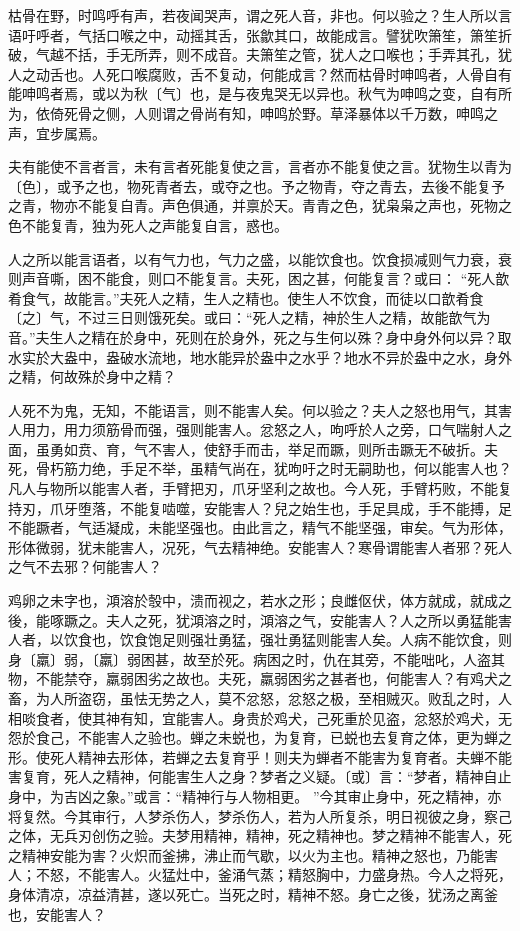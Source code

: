 \documentclass[]{article}
\begin{document}
枯骨在野，时鸣呼有声，若夜闻哭声，谓之死人音，非也。何以验之？生人所以言语吁呼者，气括口喉之中，动摇其舌，张歙其口，故能成言。譬犹吹箫笙，箫笙折破，气越不括，手无所弄，则不成音。夫箫笙之管，犹人之口喉也；手弄其孔，犹人之动舌也。人死口喉腐败，舌不复动，何能成言？然而枯骨时呻鸣者，人骨自有能呻鸣者焉，或以为秋〔气〕也，是与夜鬼哭无以异也。秋气为呻鸣之变，自有所为，依倚死骨之侧，人则谓之骨尚有知，呻鸣於野。草泽暴体以千万数，呻鸣之声，宜步属焉。

夫有能使不言者言，未有言者死能复使之言，言者亦不能复使之言。犹物生以青为〔色〕，或予之也，物死青者去，或夺之也。予之物青，夺之青去，去後不能复予之青，物亦不能复自青。声色俱通，并禀於天。青青之色，犹枭枭之声也，死物之色不能复青，独为死人之声能复自言，惑也。

人之所以能言语者，以有气力也，气力之盛，以能饮食也。饮食损减则气力衰，衰则声音嘶，困不能食，则口不能复言。夫死，困之甚，何能复言？或曰：
``死人歆肴食气，故能言。''夫死人之精，生人之精也。使生人不饮食，而徒以口歆肴食〔之〕气，不过三日则饿死矣。或曰：``死人之精，神於生人之精，故能歆气为音。''夫生人之精在於身中，死则在於身外，死之与生何以殊？身中身外何以异？取水实於大盎中，盎破水流地，地水能异於盎中之水乎？地水不异於盎中之水，身外之精，何故殊於身中之精？

人死不为鬼，无知，不能语言，则不能害人矣。何以验之？夫人之怒也用气，其害人用力，用力须筋骨而强，强则能害人。忿怒之人，呴呼於人之旁，口气喘射人之面，虽勇如贲、育，气不害人，使舒手而击，举足而蹶，则所击蹶无不破折。夫死，骨朽筋力绝，手足不举，虽精气尚在，犹呴吁之时无嗣助也，何以能害人也？凡人与物所以能害人者，手臂把刃，爪牙坚利之故也。今人死，手臂朽败，不能复持刃，爪牙堕落，不能复啮噬，安能害人？兒之始生也，手足具成，手不能搏，足不能蹶者，气适凝成，未能坚强也。由此言之，精气不能坚强，审矣。气为形体，形体微弱，犹未能害人，况死，气去精神绝。安能害人？寒骨谓能害人者邪？死人之气不去邪？何能害人？

鸡卵之未字也，澒溶於彀中，溃而视之，若水之形；良雌伛伏，体方就成，就成之後，能啄蹶之。夫人之死，犹澒溶之时，澒溶之气，安能害人？人之所以勇猛能害人者，以饮食也，饮食饱足则强壮勇猛，强壮勇猛则能害人矣。人病不能饮食，则身〔羸〕弱，〔羸〕弱困甚，故至於死。病困之时，仇在其旁，不能咄叱，人盗其物，不能禁夺，羸弱困劣之故也。夫死，羸弱困劣之甚者也，何能害人？有鸡犬之畜，为人所盗窃，虽怯无势之人，莫不忿怒，忿怒之极，至相贼灭。败乱之时，人相啖食者，使其神有知，宜能害人。身贵於鸡犬，己死重於见盗，忿怒於鸡犬，无怨於食己，不能害人之验也。蝉之未蜕也，为复育，已蜕也去复育之体，更为蝉之形。使死人精神去形体，若蝉之去复育乎！则夫为蝉者不能害为复育者。夫蝉不能害复育，死人之精神，何能害生人之身？梦者之义疑。〔或〕言：``梦者，精神自止身中，为吉凶之象。''或言：``精神行与人物相更。
''今其审止身中，死之精神，亦将复然。今其审行，人梦杀伤人，梦杀伤人，若为人所复杀，明日视彼之身，察己之体，无兵刃创伤之验。夫梦用精神，精神，死之精神也。梦之精神不能害人，死之精神安能为害？火炽而釜拂，沸止而气歇，以火为主也。精神之怒也，乃能害人；不怒，不能害人。火猛灶中，釜涌气蒸；精怒胸中，力盛身热。今人之将死，身体清凉，凉益清甚，遂以死亡。当死之时，精神不怒。身亡之後，犹汤之离釜也，安能害人？
\end{document}
